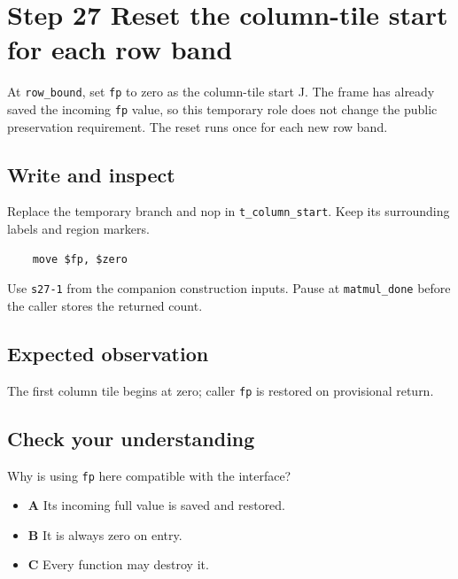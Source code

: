 \section{Step 27 Reset the column-tile start for each row band}\label{matmul-s27}

At \texttt{row\_bound}, set \texttt{fp} to zero as the column-tile start J. The frame has already saved the incoming \texttt{fp} value, so this temporary role does not change the public preservation requirement. The reset runs once for each new row band.

\subsection{Write and inspect}
Replace the temporary branch and nop in \texttt{t\_column\_start}. Keep its surrounding labels and region markers.

\begin{verbatim}
    move $fp, $zero
\end{verbatim}
Use \texttt{s27-1} from the companion construction inputs. Pause at \texttt{matmul\_done} before the caller stores the returned count.

\subsection{Expected observation}
The first column tile begins at zero; caller \texttt{fp} is restored on provisional return.

\subsection{Check your understanding}
Why is using \texttt{fp} here compatible with the interface?

\begin{itemize}
  \item \textbf{A} Its incoming full value is saved and restored.
  \item \textbf{B} It is always zero on entry.
  \item \textbf{C} Every function may destroy it.
\end{itemize}
